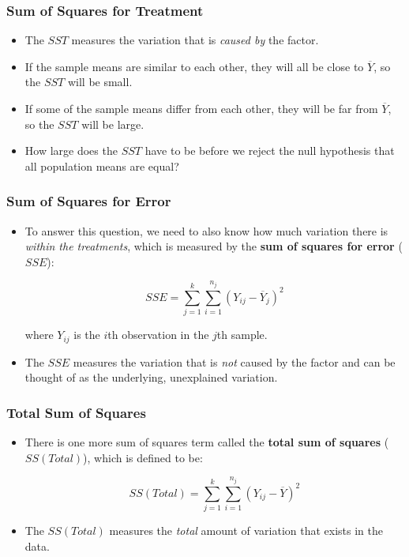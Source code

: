 \documentclass[12pt]{beamer}
\begin{document}
\begin{frame}
	\frametitle{Sum of Squares for Treatment}
	
	\begin{itemize}[label={\color{blue}$\blacktriangleright$}]
		\item The $SST$ measures the variation that is \textit{caused by} the factor.
		
		\item If the sample means are similar to each other, they will all be close to $\overline{Y}$, so the $SST$ will be small.
		
		\item If some of the sample means differ from each other, they will be far from $\overline{Y}$, so the $SST$ will be large.
		
		\item How large does the $SST$ have to be before we reject the null hypothesis that all population means are equal?
	\end{itemize}
	
\end{frame}
\begin{frame}
	\frametitle{Sum of Squares for Error}
	
	\begin{itemize}[label={\color{blue}$\blacktriangleright$}]
		\item To answer this question, we need to also know how much variation there is \textit{within the treatments}, which is measured by the \textbf{sum of squares for error} ($SSE$):
		
		\begin{equation*}
			SSE = \sum_{j=1}^k \sum_{i=1}^{n_j} (Y_{ij} - \overline{Y}_j)^2
		\end{equation*}
		
		where $Y_{ij}$ is the $i$th observation in the $j$th sample.
		
		\item The $SSE$ measures the variation that is \textit{not} caused by the factor and can be thought of as the underlying, unexplained variation.
	\end{itemize}
	
\end{frame}
\begin{frame}
	\frametitle{Total Sum of Squares}
	
	\begin{itemize}[label={\color{blue}$\blacktriangleright$}]
		\item There is one more sum of squares term called the \textbf{total sum of squares} ($SS(Total)$), which is defined to be:
		
		\begin{equation*}
			SS(Total) = \sum_{j=1}^k \sum_{i=1}^{n_j} (Y_{ij} - \overline{Y})^2
		\end{equation*}
		
		\item The $SS(Total)$ measures the \textit{total} amount of variation that exists in the data.
	\end{itemize}
	
\end{frame}
\end{document}
